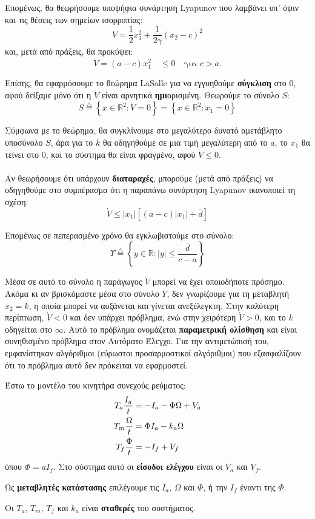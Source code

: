 \documentclass[11pt,a4paper,notitlepage,fleqn]{article}
\begin{document}
Επομένως, θα θεωρήσουμε υποψήφια συνάρτηση Lyapunov που λαμβάνει υπ' όψιν
και τις θέσεις των σημείων ισορροπίας:
\[
V = \frac{1}{2} x_1^2 +\frac{1}{2γ}(x_2 - c)^2
\]
και, μετά από πράξεις, θα προκύψει:
\[
\dot V = (a-c) x_1^2 \quad \leq 0 \quad \text{για } c > a.
\]

Επίσης, θα εφαρμόσουμε το θεώρημα LaSalle για να εγγυηθούμε \textbf{σύγκλιση} στο 0, αφού δείξαμε μόνο ότι η \( \dot V \) είναι
αρνητικά \textbf{ημι}ορισμένη. Θεωρούμε το σύνολο \( S \):
\[
S \overset{\triangle}{=} \left\lbrace 
x \in \mathbb R^2:
\dot V = 0
 \right\rbrace = \left\lbrace 
 x\in\mathbb R^2: x_1 = 0
  \right\rbrace
\]

Σύμφωνα με το θεώρημα, θα συγκλίνουμε στο μεγαλύτερο δυνατό αμετάβλητο υποσύνολο \( S \), άρα για το \( k \) θα οδηγηθούμε σε μια τιμή μεγαλύτερη
από το \( a \), το \( x_1 \) θα τείνει στο \( 0 \), και το σύστημα θα είναι
φραγμένο, αφού \( \dot V \leq 0 \).

\paragraph{}
Αν θεωρήσουμε ότι υπάρχουν \textbf{διαταραχές}, μπορούμε (μετά από πράξεις) να οδηγηθούμε στο συμπέρασμα ότι η παραπάνω συνάρτηση Lyapunov
ικανοποιεί τη σχέση:
\[
\dot V \leq |x_1| \left[
(a-c)|x_1| + \bar d
\right]
\]

Επομένως σε πεπερασμένο χρόνο θα εγκλωβιστούμε στο σύνολο:
\[
Υ \overset{\triangle}{=} \left\lbrace y \in \mathbb R
: |y| \leq \frac{\bar d}{c-a} \right\rbrace
\]

Μέσα σε αυτό το σύνολο η παράγωγος \( \dot V \) μπορεί να έχει οποιοδήποτε
πρόσημο. Ακόμα κι αν βρισκόμαστε μέσα στο σύνολο \( Y \), δεν γνωρίζουμε
για τη μεταβλητή \( x_2 = k \), η οποία μπορεί να αυξάνεται και γίνεται
ανεξέλεγκτη. Στην καλύτερη περίπτωση, \( \dot V < 0 \) και δεν υπάρχει
πρόβλημα, ενώ στην χειρότερη \( \dot V > 0 \), και το \( k \) οδηγείται
στο \( \infty \). Αυτό το πρόβλημα ονομάζεται \textbf{παραμετρική ολίσθηση}
και είναι συνηθισμένο πρόβλημα στον Αυτόματο Έλεγχο. Για την αντιμετώπισή
του, εμφανίστηκαν αλγόριθμοι (εύρωστοι προσαρμοστικοί αλγόριθμοι) που
εξασφαλίζουν ότι το πρόβλημα αυτό δεν πρόκειται να εφαρμοστεί.

\begin{exercise}
	Έστω το μοντέλο του κινητήρα συνεχούς ρεύματος:
	\begin{align*}
		T_a \frac{I_a}{t} &= -I_a - \Phi \Omega + V_a \\
		T_m \frac{\Omega}{t} &= \Phi I_a - k_a\Omega \\
		T_f \frac{\Phi}{t} &= -I_f + V_f
	\end{align*}
	όπου \( \Phi = a I_f \).
	\tcblower
	Στο σύστημα αυτό οι \textbf{είσοδοι ελέγχου} είναι οι \( V_a \) και
	\( V_f \).
	
	Ως \textbf{μεταβλητές κατάστασης} επιλέγουμε τις
	\( I_a \), \( \Omega \) και \( \Phi \), ή την \( I_f \) έναντι
	της \( \Phi \).
	
	Οι \( T_a \), \( T_m \), \( T_f \) και \( k_a \) είναι
	\textbf{σταθερές} του συστήματος.
\end{exercise}
\end{document}
